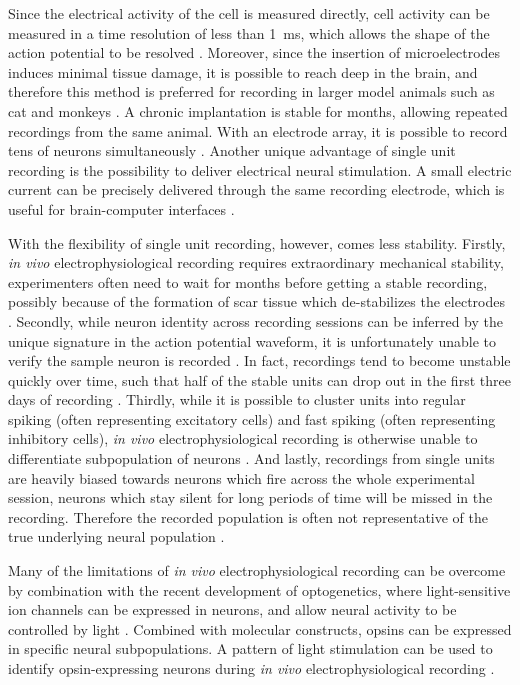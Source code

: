 Since the electrical activity of the cell is measured directly, cell activity can be measured in a time resolution of less than \SI{1}{\ms}, which allows the shape of the action potential to be resolved \citep{lutcke13}. Moreover, since the insertion of microelectrodes induces minimal tissue damage, it is possible to reach deep in the brain, and therefore this method is preferred for recording in larger model animals such as cat and monkeys \citep{lutcke13}. A chronic implantation is stable for months, allowing repeated recordings from the same animal. With an electrode array, it is possible to record tens of neurons simultaneously \citep{lutcke13}. Another unique advantage of single unit recording is the possibility to deliver electrical neural stimulation. A small electric current can be precisely delivered through the same recording electrode, which is useful for brain-computer interfaces \citep{hatsopoulos09}. 

With the flexibility of single unit recording, however, comes less stability. Firstly, \textit{in vivo} electrophysiological recording requires extraordinary mechanical stability, experimenters often need to wait for months before getting a stable recording, possibly because of the formation of scar tissue which de-stabilizes the electrodes \citep{jackson07}. Secondly, while neuron identity across recording sessions can be inferred by the unique signature in the action potential waveform, it is unfortunately unable to verify the sample neuron is recorded  \citep{rousche98, schmitzer-torbert04, tolias07}. In fact, recordings tend to become unstable quickly over time, such that half of the stable units can drop out in the first three days of recording \citep{fraser12}. Thirdly, while it is possible to cluster units into regular spiking (often representing excitatory cells) and fast spiking (often representing inhibitory cells), \textit{in vivo} electrophysiological recording is otherwise unable to differentiate subpopulation of neurons \citep{connors90}. And lastly, recordings from single units are heavily biased towards neurons which fire across the whole experimental session, neurons which stay silent for long periods of time will be missed in the recording. Therefore the recorded population is often not representative of the true underlying neural population \citep{lutcke13}. 

Many of the limitations of \textit{in vivo} electrophysiological recording can be overcome by combination with the recent development of optogenetics, where light-sensitive ion channels can be expressed in neurons, and allow neural activity to be controlled by light \citep{yizhar11}. Combined with molecular constructs, opsins can be expressed in specific neural subpopulations. A pattern of light stimulation can be used to identify opsin-expressing neurons during \textit{in vivo} electrophysiological recording \citep{zhao11}. 

